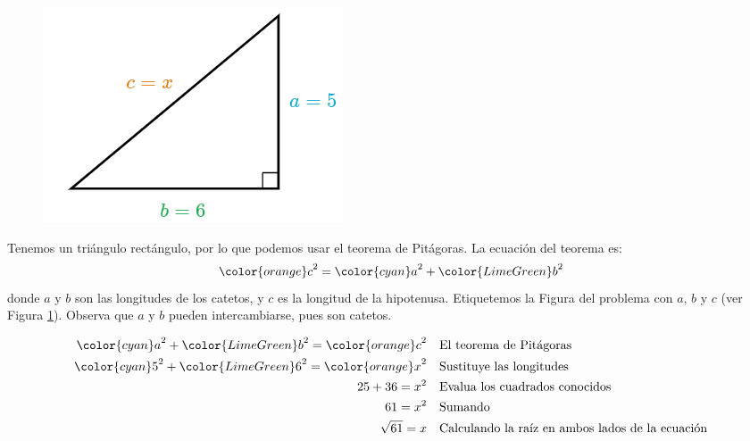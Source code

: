 \begin{minipage}[t][][t]{0.6\textwidth}
    \begin{solutionbox}{9cm}
        \begin{minipage}{0.4\textwidth}
            \begin{figure}[H]
                \centering
                \includegraphics[width=0.95\linewidth]{../images/lados_pitagoras_13a.png}
                \caption{}
                \label{fig:lados_pitagoras_13a}
            \end{figure}
        \end{minipage}\hfill
        \begin{minipage}{0.55\textwidth}
            Tenemos un triángulo rectángulo, por lo que podemos usar el teorema de Pitágoras.
            La ecuación del teorema es:
            \[{\color{orange}c}^2={\color{cyan}a}^2+{\color{LimeGreen}b}^2\]
            donde $a$ y $b$ son las longitudes de los catetos, y $c$ es la longitud de la hipotenusa.
            Etiquetemos la Figura del problema con $a$, $b$ y $c$ (ver Figura \ref{fig:lados_pitagoras_13a}).
            Observa que $a$ y $b$ pueden intercambiarse, pues son catetos.
        \end{minipage}
        \begin{align*}
            {\color{cyan}a}^2+{\color{LimeGreen}b}^2  ={\color{orange}c}^2 & \text{\quad El teorema de Pitágoras}                          \\
            {\color{cyan}5}^2+{\color{LimeGreen}6}^2  ={\color{orange}x}^2 & \text{\quad Sustituye las longitudes}                         \\
            25+36   =x^2                                                   & \text{\quad Evalua los cuadrados conocidos}                   \\
            61=x^2                                                         & \text{\quad Sumando }                                         \\
            \sqrt{61}=x                                                    & \text{\quad Calculando la raíz en ambos lados de la ecuación} \\
        \end{align*}
    \end{solutionbox}
\end{minipage}
